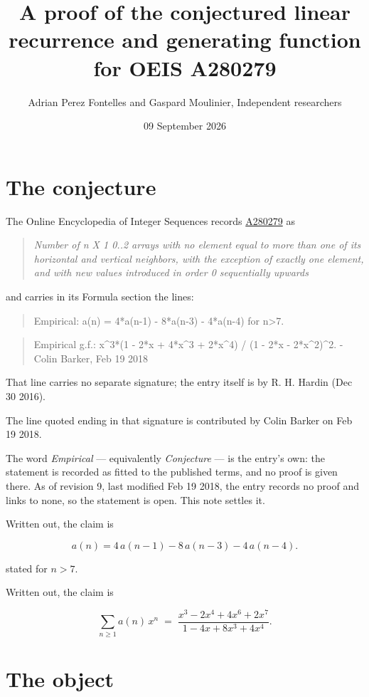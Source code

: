 \documentclass[11pt]{article}
\title{A proof of the conjectured linear recurrence and generating function for OEIS A280279}
\author{Adrian Perez Fontelles and Gaspard Moulinier, Independent researchers}
\date{09 September 2026}
\theoremstyle{definition}
\begin{document}
\maketitle
\section{The conjecture}

The Online Encyclopedia of Integer Sequences records \href{https://oeis.org/A280279}{A280279} as

\begin{quote}\itshape Number of n X 1 0..2 arrays with no element equal to more than one of its horizontal and vertical neighbors, with the exception of exactly one element, and with new values introduced in order 0 sequentially upwards\end{quote}

and carries in its Formula section the lines:

\begin{quote}\ttfamily Empirical: a(n) = 4*a(n-1) - 8*a(n-3) - 4*a(n-4) for n>7.\end{quote}

\begin{quote}\ttfamily Empirical g.f.: x\textasciicircum{}3*(1 - 2*x + 4*x\textasciicircum{}3 + 2*x\textasciicircum{}4) / (1 - 2*x - 2*x\textasciicircum{}2)\textasciicircum{}2. - Colin Barker, Feb 19 2018\end{quote}

That line carries no separate signature; the entry itself is by R. H. Hardin (Dec 30 2016).

The line quoted ending in that signature is contributed by Colin Barker on Feb 19 2018.

The word {\itshape Empirical} --- equivalently {\itshape Conjecture} --- is the entry's own: the statement is recorded as fitted to the published terms, and no proof is given there. As of revision 9, last modified Feb 19 2018, the entry records no proof and links to none, so the statement is open. This note settles it.

Written out, the claim is

\[a(n) = 4\,a(n-1) - 8\,a(n-3) - 4\,a(n-4).\]

stated for $n > 7$.

Written out, the claim is

\[\sum_{n \ge 1} a(n)\,x^n \;=\; \frac{x^{3} - 2x^{4} + 4x^{6} + 2x^{7}}{1 - 4x + 8x^{3} + 4x^{4}}.\]

\section{The object}
\end{document}
